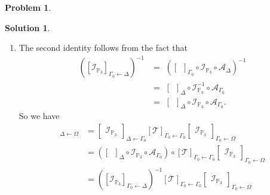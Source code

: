 \documentclass{article}
\theoremstyle{definition}
\newtheorem*{prob*}{Problem}
\newtheorem*{sln*}{Solution}
\newcommand{\T}{\mathcal{T}}
\begin{document}
\begin{prob*}
\begin{sln*}
\begin{enumerate}
\begin{enumerate}
				\item The second identity follows from the fact that
				\begin{align*}
				\left([\mathcal{I}_{\mathbb{P}_3}]_{\Gamma_0\leftarrow\Delta}\right)^{-1}
				&=\,\,
				\left([\,\,\,]_{\Gamma_0}\circ \mathcal{I}_{\mathbb{P}_3} \circ \mathcal{A}_{\Delta}\right)^{-1}\\
				&=\,\,
				[\,\,\,]_\Delta \circ \mathcal{I}^{-1}_{\mathbb{P}_3} \circ \mathcal{A}_{\Gamma_0}\\
				&=\,\,
				[\,\,\,]_\Delta \circ \mathcal{I}_{\mathbb{P}_3} \circ \mathcal{A}_{\Gamma_0}.
				\end{align*}
				So we have
				\begin{align*}
				[\T]_{\Delta\leftarrow\Omega} &=
				\begin{bmatrix}
				\mathcal{I}_{\mathbb{P}_3}
				\end{bmatrix}_{\Delta \leftarrow \Gamma_0} [\mathcal{T}]_{\Gamma_0 \leftarrow \Gamma_0} 
				\begin{bmatrix}
				\mathcal{I}_{\mathbb{P}_3}
				\end{bmatrix}_{\Gamma_0 \leftarrow \Omega}\\
				&= \left([\,\,\,]_{\Delta}\circ\mathcal{I}_{\mathbb{P}_3} \circ \mathcal{A}_{\Gamma_0}\right)\circ[\mathcal{T}]_{\Gamma_0 \leftarrow \Gamma_0} 
				\begin{bmatrix}
				\mathcal{I}_{\mathbb{P}_3}
				\end{bmatrix}_{\Gamma_0 \leftarrow \Omega}\\ &= \left([\mathcal{I}_{\mathbb{P}_3}]_{\Gamma_0\leftarrow\Delta}\right)^{-1}[\mathcal{T}]_{\Gamma_0 \leftarrow \Gamma_0} 
				\begin{bmatrix}
				\mathcal{I}_{\mathbb{P}_3}
				\end{bmatrix}_{\Gamma_0 \leftarrow \Omega}
				\end{align*}
			\end{enumerate}
		
			
			
			
			
			
			
			
			

\end{enumerate}
\end{sln*}
\end{prob*}
\end{document}
